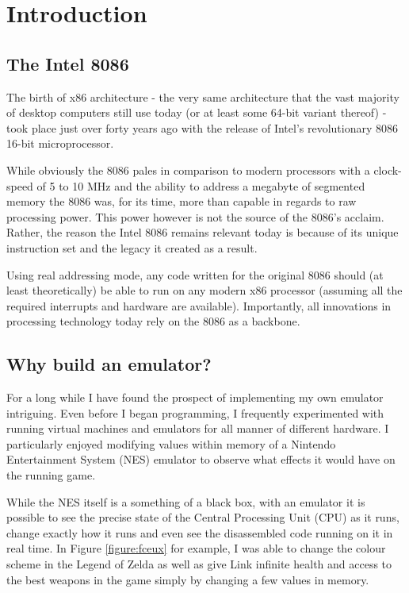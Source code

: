\section{Introduction}

\subsection{The Intel 8086}
    The birth of x86 architecture - the very same architecture that the vast majority of desktop computers still use today (or at least some 64-bit variant thereof) - took place just over forty years ago with the release of Intel's revolutionary 8086 16-bit microprocessor.

    While obviously the 8086 pales in comparison to modern processors with a clock-speed of 5 to 10 MHz and the ability to address a megabyte of segmented memory the 8086 was, for its time, more than capable in regards to raw processing power. This power however is not the source of the 8086's acclaim. Rather, the reason the Intel 8086 remains relevant today is because of its unique instruction set and the legacy it created as a result.

    Using real addressing mode, any code written for the original 8086 should (at least theoretically) be able to run on any modern x86 processor (assuming all the required interrupts and hardware are available). Importantly, all innovations in processing technology today rely on the 8086 as a backbone.

\subsection{Why build an emulator?}
	For a long while I have found the prospect of implementing my own emulator intriguing. Even before I began programming, I frequently experimented with running virtual machines and emulators for all manner of different hardware. I particularly enjoyed modifying values within memory of a Nintendo Entertainment System (NES) emulator to observe what effects it would have on the running game.

	While the NES itself is a something of a black box, with an emulator it is possible to see the precise state of the Central Processing Unit (CPU) as it runs, change exactly how it runs and even see the disassembled code running on it in real time. In Figure \ref{figure:fceux} for example, I was able to change the colour scheme in the Legend of Zelda as well as give Link infinite health and access to the best weapons in the game simply by changing a few values in memory.

